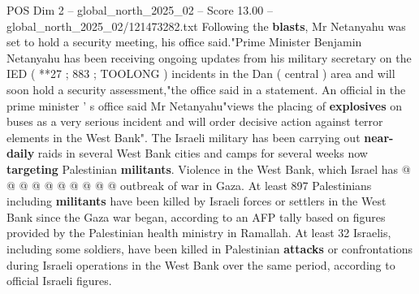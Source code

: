 \begin{textsample}{POS Dim 2 – global\_north\_2025\_02 – Score 13.00 – global\_north\_2025\_02/121473282.txt}
Following the \textbf{blasts}, Mr Netanyahu was set to hold a security meeting, his office said."Prime Minister Benjamin Netanyahu has been receiving ongoing updates from his military secretary on the IED ( **27 ; 883 ; TOOLONG ) incidents in the Dan ( central ) area and will soon hold a security assessment,"the office said in a statement.
An official in the prime minister ' s office said Mr Netanyahu"views the placing of \textbf{explosives} on buses as a very serious incident and will order decisive action against terror elements in the West Bank".
The Israeli military has been carrying out \textbf{near-daily} raids in several West Bank cities and camps for several weeks now \textbf{targeting} Palestinian \textbf{militants}.
Violence in the West Bank, which Israel has @ @ @ @ @ @ @ @ @ @ outbreak of war in Gaza.
At least 897 Palestinians including \textbf{militants} have been killed by Israeli forces or settlers in the West Bank since the Gaza war began, according to an AFP tally based on figures provided by the Palestinian health ministry in Ramallah.
At least 32 Israelis, including some soldiers, have been killed in Palestinian \textbf{attacks} or confrontations during Israeli operations in the West Bank over the same period, according to official Israeli figures.

\end{textsample}
